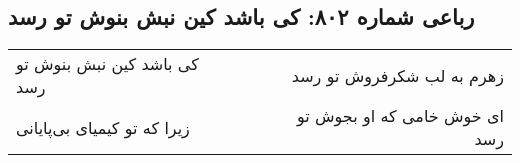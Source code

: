\begin{center}
\section*{رباعی شماره ۸۰۲: کی باشد کین نبش بنوش تو رسد}
\label{sec:0802}
\begin{longtable}{l p{0.5cm} r}
کی باشد کین نبش بنوش تو رسد
&&
زهرم به لب شکرفروش تو رسد
\\
زیرا که تو کیمیای بی‌پایانی
&&
ای خوش خامی که او بجوش تو رسد
\\
\end{longtable}
\end{center}
